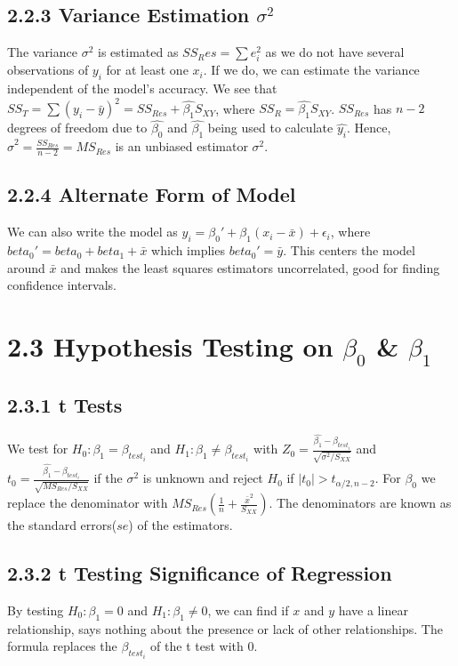 \begin{multicols*}{3}
\subsection{2.2.3 Variance Estimation $\sigma^2$}
The variance $\sigma^2$ is estimated as $SS_Res = \sum e_i^2$ as we do not have several observations of $y_i$ for at least one $x_i$. If we do, we can estimate the variance independent of the model's accuracy. We see that $SS_T = \sum (y_i - \bar{y})^2 = SS_{Res} + \hat{\beta_1} S_{XY}$, where $SS_R = \hat{\beta_1} S_{XY}$. $SS_{Res}$ has $n - 2$ degrees of freedom due to $\hat{\beta_0}$ and $\hat{\beta_1}$ being used to calculate $\hat{y_i}$. Hence, $\hat{\sigma}^2 = \frac{SS_{Res}}{n - 2} = MS_{Res}$ is an unbiased estimator $\sigma^2$.

\subsection{2.2.4 Alternate Form of Model}
We can also write the model as $y_i = \beta_0' + \beta_1(x_i - \bar{x}) + \epsilon_i$, where $beta_0' = beta_0 + beta_1 + \bar{x}$ which implies $beta_0' = \bar{y}$. This centers the model around $\bar{x}$ and makes the least squares estimators uncorrelated, good for finding confidence intervals.

\section{2.3 Hypothesis Testing on $\beta_0$ \& $\beta_1$}
\subsection{2.3.1 t Tests}
We test for $H_0: \beta_1 = \beta_{test_i}$ and $H_1: \beta_1 \ne \beta_{test_i}$ with $Z_0 = \frac{\hat{\beta_1} - \beta_{test_i}}{\sqrt{\sigma^2 / S_{XX}}}$ and $t_0 = \frac{\hat{\beta_1} - \beta_{test_i}}{\sqrt{MS_{Res} / S_{XX}}}$ if the $\sigma^2$ is unknown and reject $H_0$ if $|t_0| > t_{\alpha/2, n - 2}$. For $\beta_0$ we replace the denominator with $MS_{Res} (\frac{1}{n} + \frac{\bar{x}^2}{S_{XX}})$. The denominators are known as the standard errors($se$) of the estimators.

\subsection{2.3.2 t Testing Significance of Regression}
By testing $H_0: \beta_1 = 0$ and $H_1: \beta_1 \ne 0$, we can find if $x$ and $y$ have a linear relationship, says nothing about the presence or lack of other relationships. The formula replaces the $\beta_{test_i}$ of the t test with $0$.


\end{multicols*}

